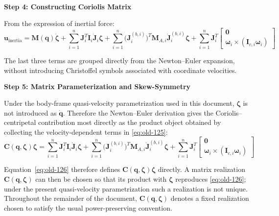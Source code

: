 \documentclass[12pt,a4paper]{report}
\begin{document}
\textbf{Step 4: Constructing Coriolis Matrix}

From the expression of inertial force:
\begin{equation}
\mathbf{u}_{\text{inertia}}
=
\mathbf{M}(\mathbf{q}) \dot{\boldsymbol{\zeta}}
+
\sum_{i=1}^{n} \mathbf{J}_i^T \mathbf{I}_i \dot{\mathbf{J}}_i \boldsymbol{\zeta}
+
\sum_{i=1}^{n} \bigl(\mathbf{J}_i^{(b,i)}\bigr)^T \mathbf{M}_{A,i} \dot{\mathbf{J}}_i^{(b,i)} \boldsymbol{\zeta}
+
\sum_{i=1}^{n}
\mathbf{J}_i^T
\begin{bmatrix}
\mathbf{0} \\
\boldsymbol{\omega}_i \times (\mathbf{I}_{c,i}\boldsymbol{\omega}_i)
\end{bmatrix}
\label{eq:old-125}
\end{equation}

The last three terms are grouped directly from the Newton--Euler expansion, without introducing Christoffel symbols associated with coordinate velocities.

\textbf{Step 5: Matrix Parameterization and Skew-Symmetry}

Under the body-frame quasi-velocity parametrization used in this document, $\boldsymbol{\zeta}$ is not introduced as $\dot{\mathbf{q}}$. Therefore the Newton--Euler derivation gives the Coriolis--centripetal contribution most directly as the product object obtained by collecting the velocity-dependent terms in \eqref{eq:old-125}:
\begin{equation}
\mathbf{C}(\mathbf{q},\boldsymbol{\zeta})\boldsymbol{\zeta}
=
\sum_{i=1}^{n} \mathbf{J}_i^T \mathbf{I}_i \dot{\mathbf{J}}_i \boldsymbol{\zeta}
+
\sum_{i=1}^{n} \bigl(\mathbf{J}_i^{(b,i)}\bigr)^T \mathbf{M}_{A,i} \dot{\mathbf{J}}_i^{(b,i)} \boldsymbol{\zeta}
+
\sum_{i=1}^{n} \mathbf{J}_i^T
\begin{bmatrix}
\mathbf{0} \\
\boldsymbol{\omega}_i \times (\mathbf{I}_{c,i}\boldsymbol{\omega}_i)
\end{bmatrix}
\label{eq:old-126}
\end{equation}

Equation~\eqref{eq:old-126} therefore defines $\mathbf{C}(\mathbf{q},\boldsymbol{\zeta})\boldsymbol{\zeta}$ directly. A matrix realization $\mathbf{C}(\mathbf{q},\boldsymbol{\zeta})$ can then be chosen so that its product with $\boldsymbol{\zeta}$ reproduces \eqref{eq:old-126}; under the present quasi-velocity parametrization such a realization is not unique. Throughout the remainder of the document, $\mathbf{C}(\mathbf{q},\boldsymbol{\zeta})$ denotes a fixed realization chosen to satisfy the usual power-preserving convention.
\end{document}
